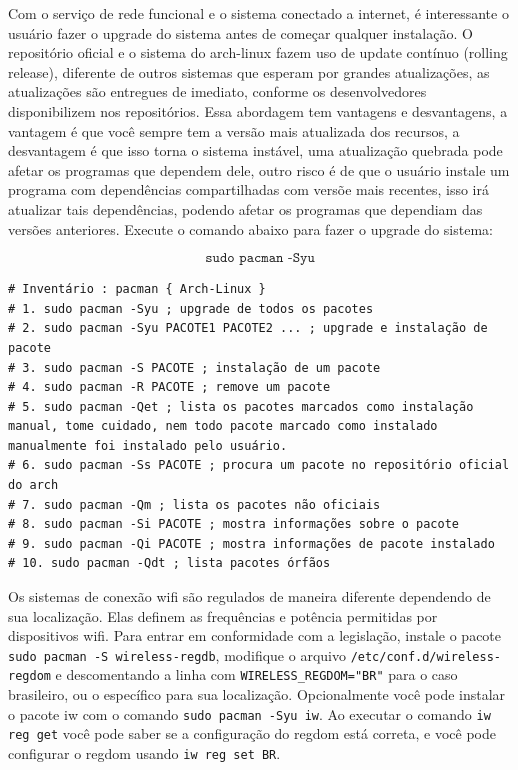 \documentclass[12pt,a4paper]{article}
\begin{document}
\vspace{\baselineskip}

Com o serviço de rede funcional e o sistema conectado a internet, é interessante o usuário fazer o upgrade do sistema antes de começar qualquer instalação. O repositório oficial e o sistema do arch-linux fazem uso de update contínuo (rolling release), diferente de outros sistemas que esperam por grandes atualizações, as atualizações são entregues de imediato, conforme os desenvolvedores disponibilizem nos repositórios. Essa abordagem tem vantagens e desvantagens, a vantagem é que você sempre tem a versão mais atualizada dos recursos, a desvantagem é que isso torna o sistema instável, uma atualização quebrada pode afetar os programas que dependem dele, outro risco é de que o usuário instale um programa com dependências compartilhadas com versõe mais recentes, isso irá atualizar tais dependências, podendo afetar os programas que dependiam das versões anteriores. Execute o comando abaixo para fazer o upgrade do sistema:

$$ \texttt{sudo pacman -Syu} $$

\begin{lstlisting}
# Inventário : pacman { Arch-Linux }
# 1. sudo pacman -Syu ; upgrade de todos os pacotes
# 2. sudo pacman -Syu PACOTE1 PACOTE2 ... ; upgrade e instalação de pacote
# 3. sudo pacman -S PACOTE ; instalação de um pacote 
# 4. sudo pacman -R PACOTE ; remove um pacote 
# 5. sudo pacman -Qet ; lista os pacotes marcados como instalação manual, tome cuidado, nem todo pacote marcado como instalado manualmente foi instalado pelo usuário.
# 6. sudo pacman -Ss PACOTE ; procura um pacote no repositório oficial do arch 
# 7. sudo pacman -Qm ; lista os pacotes não oficiais 
# 8. sudo pacman -Si PACOTE ; mostra informações sobre o pacote 
# 9. sudo pacman -Qi PACOTE ; mostra informações de pacote instalado
# 10. sudo pacman -Qdt ; lista pacotes órfãos 
\end{lstlisting}

\vspace{\baselineskip}

Os sistemas de conexão wifi são regulados de maneira diferente dependendo de sua localização. Elas definem as frequências e potência permitidas por dispositivos wifi. Para entrar em conformidade com a legislação, instale o pacote \texttt{sudo pacman -S wireless-regdb}, modifique o arquivo \texttt{/etc/conf.d/wireless-regdom} e descomentando a linha com \texttt{WIRELESS\_REGDOM="BR"} para o caso brasileiro, ou o específico para sua localização. Opcionalmente você pode instalar o pacote iw com o comando \texttt{sudo pacman -Syu iw}. Ao executar o comando \texttt{iw reg get} você pode saber se a configuração do regdom está correta, e você pode configurar o regdom usando \texttt{iw reg set BR}. \\
\end{document}

